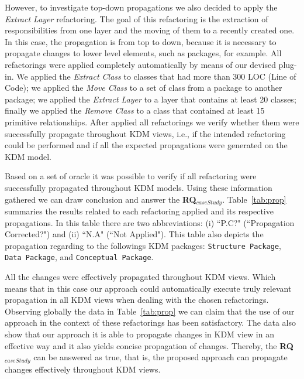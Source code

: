 However, to investigate top-down propagations we also decided to apply the \textit{Extract Layer} refactoring. The goal of this refactoring is the extraction of responsibilities from one layer and the moving of them to a recently created one. In this case, the propagation is from top to down, because it is necessary to propagate changes to lower level elements, such as packages, for example. All refactorings were applied completely automatically by means of our devised plug-in. %
We applied the \textit{Extract Class} to classes that had more than 300 LOC (Line of Code); we applied the \textit{Move Class} to a set of class from a package to another package; we applied the \textit{Extract Layer} to a layer that contains at least 20 classes; finally we applied the \textit{Remove Class} to a class that contained at least 15 primitive relationships. After applied all refactorings we verify whether them were successfully propagate throughout KDM views, i.e., if the intended refactoring could be performed and if all the expected propagations were generated on the KDM model. 

Based on a set of oracle it was possible to verify if all refactoring were successfully propagated throughout KDM models. Using these information gathered we can draw conclusion and answer the \textbf{RQ$_{caseStudy}$}. Table~\ref{tab:prop} summaries the results related to each refactoring applied and its respective propagations. In this table there are two abbreviations: (i) ``P.C?" (``Propagation Corrected?") and (ii) ``N.A" (``Not Applied"). This table also depicts the propagation regarding to the followings KDM packages: \texttt{Structure Package}, \texttt{Data Package}, and \texttt{Conceptual Package}. 

All the changes were effectively propagated throughout KDM views. Which means that in this case our approach could automatically execute truly relevant propagation in all KDM views when dealing with the chosen refactorings. Observing globally the data in Table~\ref{tab:prop} we can claim that the use of our approach in the context of these refactorings has been satisfactory. The data also show that our approach it is able to propagate changes in KDM view in an effective way and it also yields concise propagation of changes. Thereby, the \textbf{RQ$_{caseStudy}$} can be answered as true, that is, the proposed approach can propagate changes effectively throughout KDM views.

